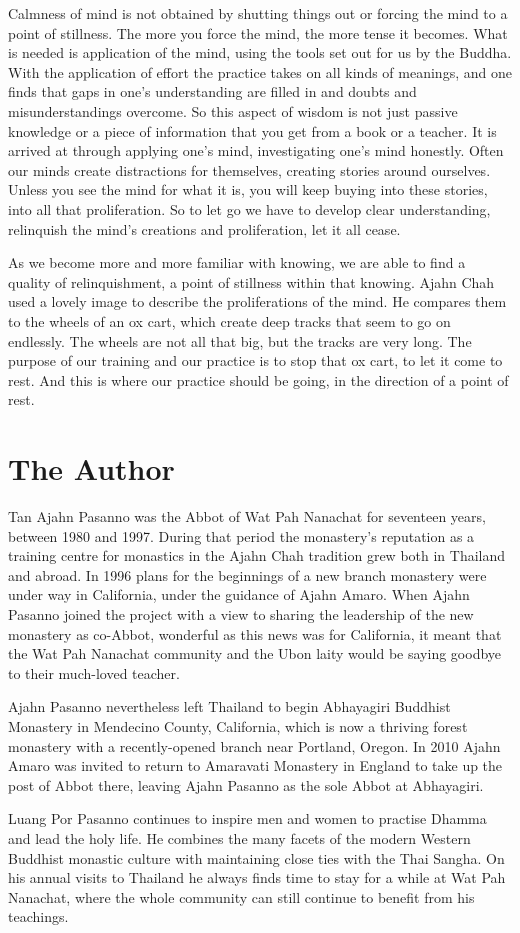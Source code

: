Calmness of mind is not obtained by shutting things out or forcing the
mind to a point of stillness. The more you force the mind, the more
tense it becomes. What is needed is application of the mind, using the
tools set out for us by the Buddha. With the application of effort the
practice takes on all kinds of meanings, and one finds that gaps in
one's understanding are filled in and doubts and misunderstandings
overcome. So this aspect of wisdom is not just passive knowledge or a
piece of information that you get from a book or a teacher. It is
arrived at through applying one's mind, investigating one's mind
honestly. Often our minds create distractions for themselves, creating
stories around ourselves. Unless you see the mind for what it is, you
will keep buying into these stories, into all that proliferation. So to
let go we have to develop clear understanding, relinquish the mind's
creations and proliferation, let it all cease. 

As we become more and more familiar with knowing, we are able to find a
quality of relinquishment, a point of stillness within that knowing. 
Ajahn Chah used a lovely image to describe the proliferations of the
mind. He compares them to the wheels of an ox cart, which create deep
tracks that seem to go on endlessly. The wheels are not all that big, 
but the tracks are very long. The purpose of our training and our
practice is to stop that ox cart, to let it come to rest. And this is
where our practice should be going, in the direction of a point of rest. 

\dividerRule

\section{The Author}

Tan Ajahn Pasanno was the Abbot of Wat Pah Nanachat for seventeen
years, between 1980 and 1997. During that period the monastery's
reputation as a training centre for monastics in the Ajahn Chah
tradition grew both in Thailand and abroad. In 1996 plans for the
beginnings of a new branch monastery were under way in California, under
the guidance of Ajahn Amaro. When Ajahn Pasanno joined the project with
a view to sharing the leadership of the new monastery as co-Abbot, 
wonderful as this news was for California, it meant that the Wat Pah
Nanachat community and the Ubon laity would be saying goodbye to their
much-loved teacher.

Ajahn Pasanno nevertheless left Thailand to begin Abhayagiri Buddhist
Monastery in Mendecino County, California, which is now a thriving
forest monastery with a recently-opened branch near Portland, Oregon. In
2010 Ajahn Amaro was invited to return to Amaravati Monastery in England
to take up the post of Abbot there, leaving Ajahn Pasanno as the sole
Abbot at Abhayagiri. 

Luang Por Pasanno continues to inspire men and women to practise
Dhamma and lead the holy life. He combines the many facets of the modern
Western Buddhist monastic culture with maintaining close ties with the
Thai Sangha. On his annual visits to Thailand he always finds time to
stay for a while at Wat Pah Nanachat, where the whole community can
still continue to benefit from his teachings.

